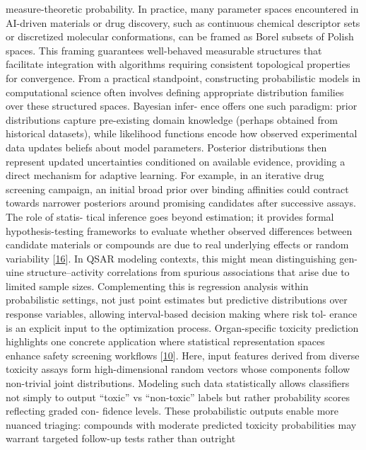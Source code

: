 \documentclass[
]{article}
\begin{document}
measure-theoretic probability. In practice, many parameter spaces
encountered in AI-driven materials or drug discovery, such as continuous
chemical descriptor sets or discretized molecular conformations, can be
framed as Borel subsets of Polish spaces. This framing guarantees
well-behaved measurable structures that facilitate integration with
algorithms requiring consistent topological properties for convergence.
From a practical standpoint, constructing probabilistic models in
computational science often involves defining appropriate distribution
families over these structured spaces. Bayesian infer- ence offers one
such paradigm: prior distributions capture pre-existing domain knowledge
(perhaps obtained from historical datasets), while likelihood functions
encode how observed experimental data updates beliefs about model
parameters. Posterior distributions then represent updated uncertainties
conditioned on available evidence, providing a direct mechanism for
adaptive learning. For example, in an iterative drug screening campaign,
an initial broad prior over binding affinities could contract towards
narrower posteriors around promising candidates after successive assays.
The role of statis- tical inference goes beyond estimation; it provides
formal hypothesis-testing frameworks to evaluate whether observed
differences between candidate materials or compounds are due to real
underlying effects or random variability
{[}\protect\hyperlink{_bookmark56}{16}{]}. In QSAR modeling contexts,
this might mean distinguishing gen- uine structure--activity
correlations from spurious associations that arise due to limited sample
sizes. Complementing this is regression analysis within probabilistic
settings, not just point estimates but predictive distributions over
response variables, allowing interval-based decision making where risk
tol- erance is an explicit input to the optimization process.
Organ-specific toxicity prediction highlights one concrete application
where statistical representation spaces enhance safety screening
workflows {[}\protect\hyperlink{_bookmark50}{10}{]}. Here, input
features derived from diverse toxicity assays form high-dimensional
random vectors whose components follow non-trivial joint distributions.
Modeling such data statistically allows classifiers not simply to output
``toxic'' vs ``non-toxic'' labels but rather probability scores
reflecting graded con- fidence levels. These probabilistic outputs
enable more nuanced triaging: compounds with moderate predicted toxicity
probabilities may warrant targeted follow-up tests rather than outright
\end{document}
